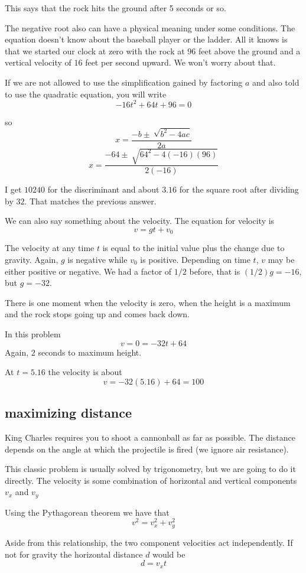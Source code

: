 \documentclass[11pt, oneside]{article}
\begin{document}
This says that the rock hits the ground after 5 seconds or so.  

The negative root also can have a physical meaning under some conditions.  The equation doesn't know about the baseball player or the ladder.  All it knows is that we started our clock at zero with the rock at $96$ feet above the ground and a vertical velocity of $16$ feet per second upward.  We won't worry about that.

If we are not allowed to use the simplification gained by factoring $a$ and also told to use the quadratic equation, you will write
\[ -16t^2 + 64t + 96 = 0 \]

so
\[ x = \frac{-b \pm \ \sqrt{b^2 - 4ac}}{2a} \]
\[ x = \frac{-64 \pm \ \sqrt{64^2 -4(-16)(96)}}{2(-16)} \]

I get $10240$ for the discriminant and about $3.16$ for the square root after dividing by $32$.  That matches the previous answer.

We can also say something about the velocity.  The equation for velocity is
\[ v = gt + v_0 \]

The velocity at any time $t$ is equal to the initial value plus the change due to gravity.  Again, $g$ is negative while $v_0$ is positive.  Depending on time $t$, $v$ may be either positive or negative.  We had a factor of $1/2$ before, that is $(1/2)g = -16$, but $g = -32$.

There is one moment when the velocity is zero, when the height is a maximum and the rock stops going up and comes back down.

In this problem
\[ v = 0 = -32t + 64 \]
Again, $2$ seconds to maximum height.

At $t = 5.16$ the velocity is about
\[ v = -32 (5.16) + 64 = 100 \]

\subsection*{maximizing distance}
King Charles requires you to shoot a cannonball as far as possible.  The distance depends on the angle at which the projectile is fired (we ignore air resistance).  

This classic problem is usually solved by trigonometry, but we are going to do it directly.  The velocity is some combination of horizontal and vertical components $v_x$ and $v_y$

Using the Pythagorean theorem we have that
\[ v^2 = v_x^2 + v_y^2 \]

Aside from this relationship, the two component velocities act independently.  If not for gravity the horizontal distance $d$ would be 
\[ d = v_x t \]
\end{document}

